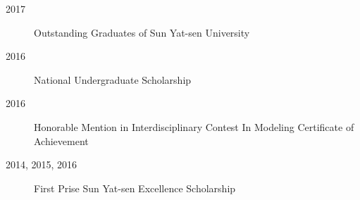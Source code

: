 {}
\begin{description}
\item  [2017] Outstanding Graduates of Sun Yat-sen University
\item  [2016] National Undergraduate Scholarship
\item  [2016] Honorable Mention in Interdisciplinary Contest In Modeling Certificate of Achievement
\item  [2014, 2015, 2016] First Prise Sun Yat-sen Excellence Scholarship
\end{description}

